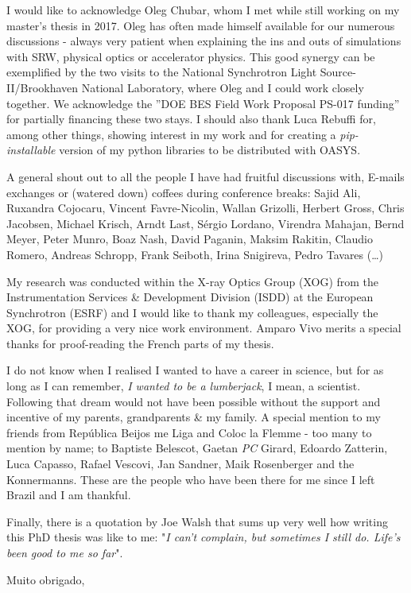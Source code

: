 I would like to acknowledge Oleg Chubar, whom I met while still working on my master's thesis in 2017. Oleg has often made himself available for our numerous discussions - always very patient when explaining the ins and outs of simulations with SRW, physical optics or accelerator physics. This good synergy can be exemplified by the two visits to the National Synchrotron Light Source-II/Brookhaven National Laboratory, where Oleg and I could work closely together. We acknowledge the ”DOE BES Field Work Proposal PS-017 funding” for partially financing these two stays. I should also thank Luca Rebuffi for, among other things, showing interest in my work and for creating a \textit{pip-installable} version of my python libraries to be distributed with OASYS.

A general shout out to all the people I have had fruitful discussions with, E-mails exchanges or (watered down) coffees during conference breaks: Sajid Ali, Ruxandra Cojocaru, Vincent Favre-Nicolin, Wallan Grizolli, Herbert Gross, Chris Jacobsen, Michael Krisch, Arndt Last, S\'ergio Lordano, Virendra Mahajan, Bernd Meyer, Peter Munro, Boaz Nash, David Paganin, Maksim Rakitin, Claudio Romero, Andreas Schropp, Frank Seiboth, Irina Snigireva, Pedro Tavares (…)

My research was conducted within the X-ray Optics Group (XOG) from the Instrumentation Services \& Development Division (ISDD) at the European Synchrotron (ESRF) and I would like to thank my colleagues, especially the XOG, for providing a very nice work environment. Amparo Vivo merits a special thanks for proof-reading the French parts of my thesis.

I do not know when I realised I wanted to have a career in science, but for as long as I can remember, \textit{I wanted to be a lumberjack}, I mean, a scientist. Following that dream would not have been possible without the support and incentive of my parents, grandparents \& my family. A special mention to my friends from Rep\'ublica Beijos me Liga and Coloc la Flemme - too many to mention by name; to Baptiste Belescot, Gaetan \textit{PC} Girard, Edoardo Zatterin, Luca Capasso, Rafael Vescovi, Jan Sandner, Maik Rosenberger and the Konnermanns. These are the people who have been there for me since I left Brazil and I am thankful.

Finally, there is a quotation by Joe Walsh that sums up very well how writing this PhD thesis was like to me: "\textit{I can't complain, but sometimes I still do. Life's been good to me so far}".

\vfill
\begin{flushright}
	\begin{minipage}{5cm}
	    \centering Muito obrigado,\\
		\centering\thesisName
	\end{minipage}
\end{flushright}
\vfill